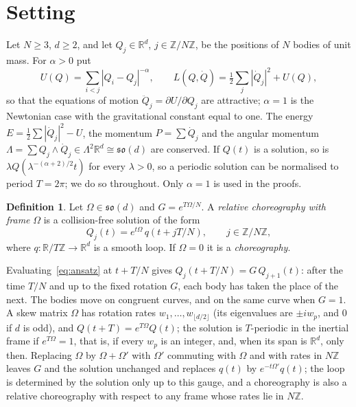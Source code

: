 \documentclass[11pt]{amsart}
\theoremstyle{definition}
\newtheorem{definition}[theorem]{Definition}
\newcommand{\R}{\mathbb{R}}
\newcommand{\Z}{\mathbb{Z}}
\newcommand{\so}{\mathfrak{so}}
\begin{document}
\section{Setting}\label{sec:setting}

Let $N\ge3$, $d\ge2$, and let $Q_j\in\R^d$, $j\in\Z/N\Z$, be the positions of $N$ bodies of unit mass. For $\alpha>0$ put
\[
U(Q)=\sum_{i<j}|Q_i-Q_j|^{-\alpha},\qquad L(Q,\dot Q)=\tfrac12\sum_j|\dot Q_j|^2+U(Q),
\]
so that the equations of motion $\ddot Q_j=\partial U/\partial Q_j$ are attractive; $\alpha=1$ is the Newtonian case with the gravitational constant equal to one. The energy $E=\frac12\sum|\dot Q_j|^2-U$, the momentum $P=\sum\dot Q_j$ and the angular momentum $\Lambda=\sum Q_j\wedge\dot Q_j\in\Lambda^2\R^d\cong\so(d)$ are conserved. If $Q(t)$ is a solution, so is $\lambda Q(\lambda^{-(\alpha+2)/2}t)$ for every $\lambda>0$, so a periodic solution can be normalised to period $T=2\pi$; we do so throughout. Only $\alpha=1$ is used in the proofs.

\begin{definition}\label{def:chor}
Let $\Omega\in\so(d)$ and $G=e^{T\Omega/N}$. A \emph{relative choreography with frame} $\Omega$ is a collision-free solution of the form
\begin{equation}\label{eq:ansatz}
Q_j(t)=e^{t\Omega}\,q(t+jT/N),\qquad j\in\Z/N\Z,
\end{equation}
where $q\colon\R/T\Z\to\R^d$ is a smooth loop. If $\Omega=0$ it is a \emph{choreography}.
\end{definition}

Evaluating~\eqref{eq:ansatz} at $t+T/N$ gives $Q_j(t+T/N)=G\,Q_{j+1}(t)$: after the time $T/N$ and up to the fixed rotation $G$, each body has taken the place of the next. The bodies move on congruent curves, and on the same curve when $G=1$. A skew matrix $\Omega$ has rotation rates $w_1,\dots,w_{\lfloor d/2\rfloor}$ (its eigenvalues are $\pm iw_p$, and $0$ if $d$ is odd), and $Q(t+T)=e^{T\Omega}Q(t)$; the solution is $T$-periodic in the inertial frame if $e^{T\Omega}=1$, that is, if every $w_p$ is an integer, and, when its span is $\R^d$, only then. Replacing $\Omega$ by $\Omega+\Omega'$ with $\Omega'$ commuting with $\Omega$ and with rates in $N\Z$ leaves $G$ and the solution unchanged and replaces $q(t)$ by $e^{-t\Omega'}q(t)$; the loop is determined by the solution only up to this gauge, and a choreography is also a relative choreography with respect to any frame whose rates lie in $N\Z$.
\end{document}
